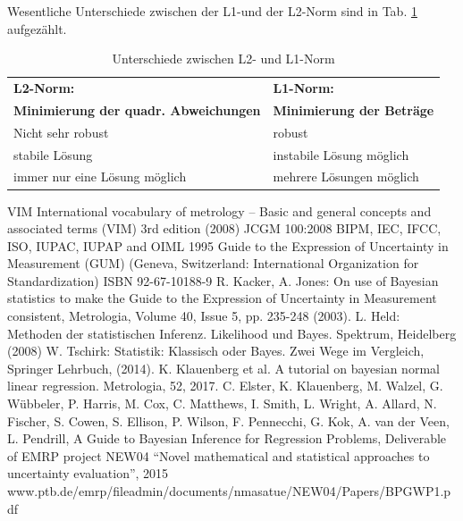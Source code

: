 Wesentliche Unterschiede zwischen der L1-und der L2-Norm sind in 
Tab. \ref{tab:L2_und_L1_Norm} aufgezählt.
\begin{table}[!htbp]
	\caption{Unterschiede zwischen L2- und L1-Norm} 
	\vspace*{1ex}
	\label{tab:L2_und_L1_Norm}
	\centering
	\begin{tabular}{|m{8cm} | m{8cm}| }  \hline
	\textbf{L2-Norm:} & \textbf{L1-Norm:} \\
  \textbf{Minimierung der quadr. Abweichungen} & \textbf{Minimierung der Beträge} \\ \hline
   Nicht sehr robust & robust \\ \hline
   stabile Lösung & instabile Lösung möglich \\\hline
   immer nur eine Lösung möglich & mehrere Lösungen möglich \\\hline
	\end{tabular}
\end{table}


\begin{thebibliography}{------}
 \item[] \hspace*{5em}{\Large\bf zu Kapitel 8:}
 VIM International vocabulary of
metrology – Basic and general
concepts and associated terms (VIM) 3rd edition (2008)
 JCGM 100:2008 BIPM, IEC, IFCC, ISO, IUPAC, IUPAP and OIML 1995 Guide to the Expression of Uncertainty in Measurement (GUM)
(Geneva, Switzerland: International Organization for
Standardization) ISBN 92-67-10188-9
 R. Kacker, A. Jones: On use of Bayesian statistics to make the Guide to the Expression of Uncertainty in Measurement consistent, 
	Metrologia, Volume 40, Issue 5, pp. 235-248 (2003).
 L. Held: Methoden der statistischen Inferenz. 
Likelihood und Bayes. Spektrum, Heidelberg (2008)
 W. Tschirk: Statistik: Klassisch oder Bayes.
Zwei Wege im Vergleich, Springer Lehrbuch, (2014).
 K. Klauenberg et al. A tutorial on bayesian normal linear regression. Metrologia, 52, 2017.
 C. Elster, K. Klauenberg, M. Walzel, G. Wübbeler, P. Harris, M. Cox, C. Matthews, I. Smith, L. Wright, A. Allard, N. Fischer, S. Cowen, S. Ellison,
P. Wilson, F. Pennecchi, G. Kok, A. van der Veen, L. Pendrill,
A Guide to Bayesian Inference for Regression Problems, Deliverable of EMRP project NEW04 “Novel mathematical and statistical approaches to uncertainty evaluation”, 2015 \newline
www.ptb.de/emrp/fileadmin/documents/nmasatue/NEW04/Papers/BPGWP1.pdf
\end{thebibliography}

